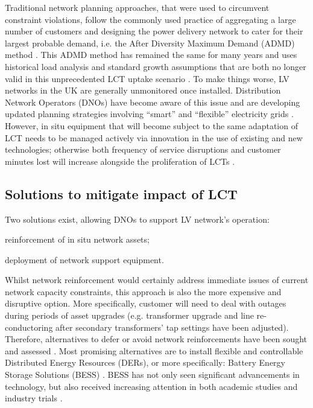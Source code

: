Traditional network planning approaches, that were used to circumvent constraint violations, follow the commonly used practice of aggregating a large number of customers and designing the power delivery network to cater for their largest probable demand, i.e. the After Diversity Maximum Demand (ADMD) method \cite{Richardson2010a}.
This ADMD method has remained the same for many years and uses historical load analysis and standard growth assumptions that are both no longer valid in this unprecedented LCT uptake scenario \cite{Yunusov2016}.
To make things worse, LV networks in the UK are generally unmonitored once installed.
Distribution Network Operators (DNOs) have become aware of this issue and are developing updated planning strategies involving ``smart'' and ``flexible'' electricity grids \cite{Fang2012}.
However, in situ equipment that will become subject to the same adaptation of LCT needs to be managed actively via innovation in the use of existing and new technologies; otherwise both frequency of service disruptions and customer minutes lost will increase alongside the proliferation of LCTs \cite{Ault2008a}.

\subsection{Solutions to mitigate impact of LCT}
\label{ch-introduction:subsec:solutions-to-mitigate-impact-of-lct}

Two solutions exist, allowing DNOs to support LV network's operation: 
\begin{enumerate*}
	\item reinforcement of in situ network assets;
	\item deployment of network support equipment.
\end{enumerate*}
Whilst network reinforcement would certainly address immediate issues of current network capacity constraints, this approach is also the more expensive and disruptive option.
More specifically, customer will need to deal with outages during periods of asset upgrades (e.g. transformer upgrade and line re-conductoring after secondary transformers' tap settings have been adjusted).
Therefore, alternatives to defer or avoid network reinforcements have been sought and assessed \cite{Harrison2007, Zangs2016a, VanderKlauw2016d, Greenwood2017}.
Most promising alternatives are to install flexible and controllable Distributed Energy Resources (DERs), or more specifically: Battery Energy Storage Solutions (BESS) \cite{Wade2010}.
BESS has not only seen significant advancements in technology, but also received increasing attention in both academic studies and industry trials \cite{Palizban2016}.

